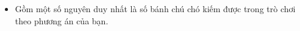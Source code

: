 \begin{itemize}
	\item     Gồm một số nguyên duy nhất là số bánh chú chó kiếm được trong trò chơi theo phương án của bạn.   
\end{itemize}

\
